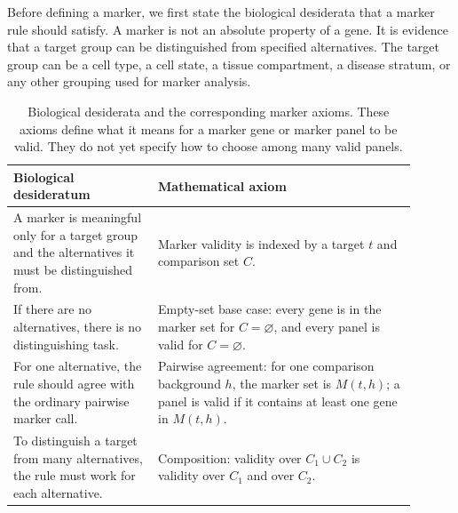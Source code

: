 \documentclass{article}
\begin{document}
Before defining a marker, we first state the biological desiderata that a marker rule should satisfy. A marker is not an absolute property of a gene. It is evidence that a target group can be distinguished from specified alternatives. The target group can be a cell type, a cell state, a tissue compartment, a disease stratum, or any other grouping used for marker analysis.

\begin{table}[h]
\centering
\small
\begin{tabular}{p{0.32\linewidth}p{0.58\linewidth}}
\toprule
Biological desideratum & Mathematical axiom \\
\midrule
A marker is meaningful only for a target group and the alternatives it must be distinguished from. & Marker validity is indexed by a target $t$ and comparison set $C$. \\
If there are no alternatives, there is no distinguishing task. & Empty-set base case: every gene is in the marker set for $C=\varnothing$, and every panel is valid for $C=\varnothing$. \\
For one alternative, the rule should agree with the ordinary pairwise marker call. & Pairwise agreement: for one comparison background $h$, the marker set is $M(t,h)$; a panel is valid if it contains at least one gene in $M(t,h)$. \\
To distinguish a target from many alternatives, the rule must work for each alternative. & Composition: validity over $C_1\cup C_2$ is validity over $C_1$ and over $C_2$. \\
\bottomrule
\end{tabular}
\caption{Biological desiderata and the corresponding marker axioms. These axioms define what it means for a marker gene or marker panel to be valid. They do not yet specify how to choose among many valid panels.}
\label{tab:marker-desiderata-axioms}
\end{table}
\end{document}
